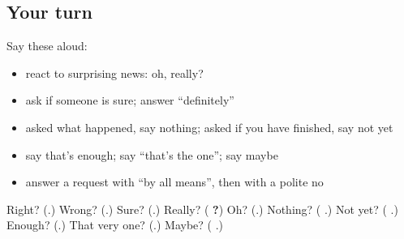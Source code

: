 \subsection*{Your turn}
Say these aloud:

\begin{itemize}
\raggedright
  \item react to surprising news: oh, really?
  \item ask if someone is sure; answer \textquotedblleft{}definitely\textquotedblright{}
  \item asked what happened, say nothing; asked if you have finished, say not yet
  \item say that's enough; say \textquotedblleft{}that's the one\textquotedblright{}; say maybe
  \item answer a request with \textquotedblleft{}by all means\textquotedblright{}, then with a polite no
\end{itemize}

\begin{tcolorbox}[breakable,colback=teal!4,colframe=teal!35!black,title={Before you move on}]
Right? (\textbf{}.) Wrong? (\textbf{}.) Sure? (\textbf{}.) Really? (\textbf{ ?}) Oh? (\textbf{}.) Nothing? (\textbf{ }.) Not yet? (\textbf{ }.) Enough? (\textbf{}.) That very one? (\textbf{}.) Maybe? (\textbf{  }.)
\end{tcolorbox}

